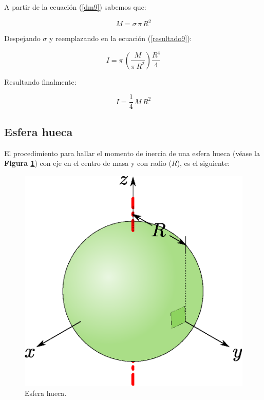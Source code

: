 \documentclass[letter,oneside,11pt]{article}
\begin{document}
A partir de la ecuación (\ref{dm9}) sabemos que:

\begin{equation*}
    M = \sigma\, \pi\, R^2
\end{equation*}

Despejando $\sigma$ y reemplazando en la ecuación (\ref{resultado9}):

\begin{equation*}
    I = \pi\, \left( \frac{M}{\pi\, R^2} \right) \frac{R^4}{4}
\end{equation*}

Resultando finalmente:

\begin{equation}
    I = \frac{1}{4}\, M\, R^2
\end{equation}

\subsection{Esfera hueca}
El procedimiento para hallar el momento de inercia de una esfera hueca
(véase la \textbf{Figura \ref{figura15}}) con eje en el centro de masa y con
radio ($R$), es el siguiente:

\begin{figure}
\centering
\includegraphics[scale=0.5]{resources/f15.eps}
\caption{Esfera hueca.}
\label{figura15}
\end{figure}
\end{document}
